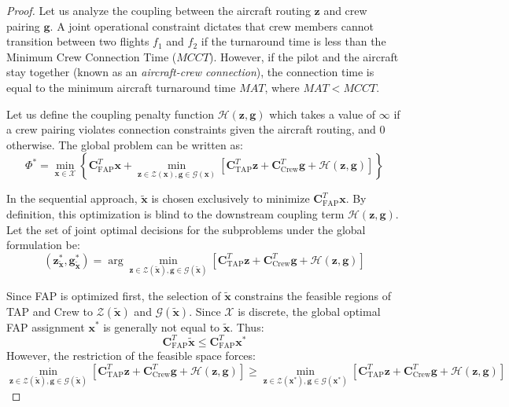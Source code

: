 \documentclass[11pt,a4paper]{book}
\begin{document}
\begin{proof}
Let us analyze the coupling between the aircraft routing $\mathbf{z}$ and crew pairing $\mathbf{g}$. A joint operational constraint dictates that crew members cannot transition between two flights $f_1$ and $f_2$ if the turnaround time is less than the Minimum Crew Connection Time ($MCCT$). However, if the pilot and the aircraft stay together (known as an \textit{aircraft-crew connection}), the connection time is equal to the minimum aircraft turnaround time $MAT$, where $MAT < MCCT$.

Let us define the coupling penalty function $\mathcal{H}(\mathbf{z}, \mathbf{g})$ which takes a value of $\infty$ if a crew pairing violates connection constraints given the aircraft routing, and $0$ otherwise. 
The global problem can be written as:
\begin{equation}
\Phi^* = \min_{\mathbf{x} \in \mathcal{X}} \left\{ \mathbf{C}_{\text{FAP}}^T \mathbf{x} + \min_{\mathbf{z} \in \mathcal{Z}(\mathbf{x}), \mathbf{g} \in \mathcal{G}(\mathbf{x})} \left[ \mathbf{C}_{\text{TAP}}^T \mathbf{z} + \mathbf{C}_{\text{Crew}}^T \mathbf{g} + \mathcal{H}(\mathbf{z}, \mathbf{g}) \right] \right\}
\end{equation}

In the sequential approach, $\mathbf{\tilde{x}}$ is chosen exclusively to minimize $\mathbf{C}_{\text{FAP}}^T \mathbf{x}$. By definition, this optimization is blind to the downstream coupling term $\mathcal{H}(\mathbf{z}, \mathbf{g})$.
Let the set of joint optimal decisions for the subproblems under the global formulation be:
\begin{equation}
(\mathbf{z}^*_{\mathbf{\tilde{x}}}, \mathbf{g}^*_{\mathbf{\tilde{x}}}) = \arg\min_{\mathbf{z} \in \mathcal{Z}(\mathbf{\tilde{x}}), \mathbf{g} \in \mathcal{G}(\mathbf{\tilde{x}})} \left[ \mathbf{C}_{\text{TAP}}^T \mathbf{z} + \mathbf{C}_{\text{Crew}}^T \mathbf{g} + \mathcal{H}(\mathbf{z}, \mathbf{g}) \right]
\end{equation}

Since FAP is optimized first, the selection of $\mathbf{\tilde{x}}$ constrains the feasible regions of TAP and Crew to $\mathcal{Z}(\mathbf{\tilde{x}})$ and $\mathcal{G}(\mathbf{\tilde{x}})$. Since $\mathcal{X}$ is discrete, the global optimal FAP assignment $\mathbf{x}^*$ is generally not equal to $\mathbf{\tilde{x}}$.
Thus:
\begin{equation}
\mathbf{C}_{\text{FAP}}^T \mathbf{\tilde{x}} \leq \mathbf{C}_{\text{FAP}}^T \mathbf{x}^*
\end{equation}
However, the restriction of the feasible space forces:
\begin{equation}
\min_{\mathbf{z} \in \mathcal{Z}(\mathbf{\tilde{x}}), \mathbf{g} \in \mathcal{G}(\mathbf{\tilde{x}})} \left[ \mathbf{C}_{\text{TAP}}^T \mathbf{z} + \mathbf{C}_{\text{Crew}}^T \mathbf{g} + \mathcal{H}(\mathbf{z}, \mathbf{g}) \right] \geq \min_{\mathbf{z} \in \mathcal{Z}(\mathbf{x}^*), \mathbf{g} \in \mathcal{G}(\mathbf{x}^*)} \left[ \mathbf{C}_{\text{TAP}}^T \mathbf{z} + \mathbf{C}_{\text{Crew}}^T \mathbf{g} + \mathcal{H}(\mathbf{z}, \mathbf{g}) \right]
\end{equation}


\end{proof}
\end{document}
